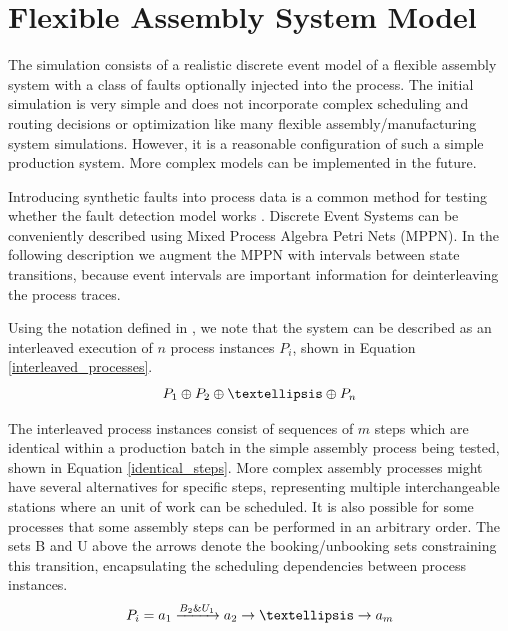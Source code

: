 \documentclass[journal]{IEEEtran}
\begin{document}
\section{Flexible Assembly System Model}

The simulation consists of a realistic discrete event model of a flexible assembly system with a class of faults optionally injected into the process.
The initial simulation is very simple and does not incorporate complex scheduling and routing decisions or optimization like many flexible assembly/manufacturing system simulations\cite{donath1988flexible}.
However, it is a reasonable configuration of such a simple production system. More complex models can be implemented in the future.

Introducing synthetic faults into process data is a common method for testing whether the fault detection model works \cite{able2016model}.
Discrete Event Systems can be conveniently
described using Mixed Process Algebra Petri Nets (MPPN)\cite{falkman2001modeling}. In the following description we augment the MPPN with intervals between state transitions,
because event intervals are important information for deinterleaving the process traces.

Using the notation defined in \cite{falkman2001combined}, we note that the system can be described as an interleaved execution of $ n $ process instances $ P_i $, shown in
Equation \ref{interleaved_processes}.
\begin{equation}
 P_1 \oplus P_2 \oplus \textellipsis \oplus P_n
 \label{interleaved_processes}
\end{equation}

The interleaved process instances consist of sequences of $ m $ steps which are identical within a production batch in the simple assembly process being tested, shown in Equation \ref{identical_steps}.
More complex assembly processes might have several alternatives for specific steps, representing multiple interchangeable stations where an unit of work can be scheduled.
It is also possible for some processes that some assembly steps can be performed in an arbitrary order.
The sets B and U above the arrows denote the booking/unbooking sets constraining this transition, encapsulating the scheduling dependencies between process instances.
\begin{equation}
 P_i = a_1 \xrightarrow{B_2 \& U_1} a_2 \rightarrow \textellipsis \rightarrow a_m
 \label{identical_steps}
\end{equation}
\end{document}
